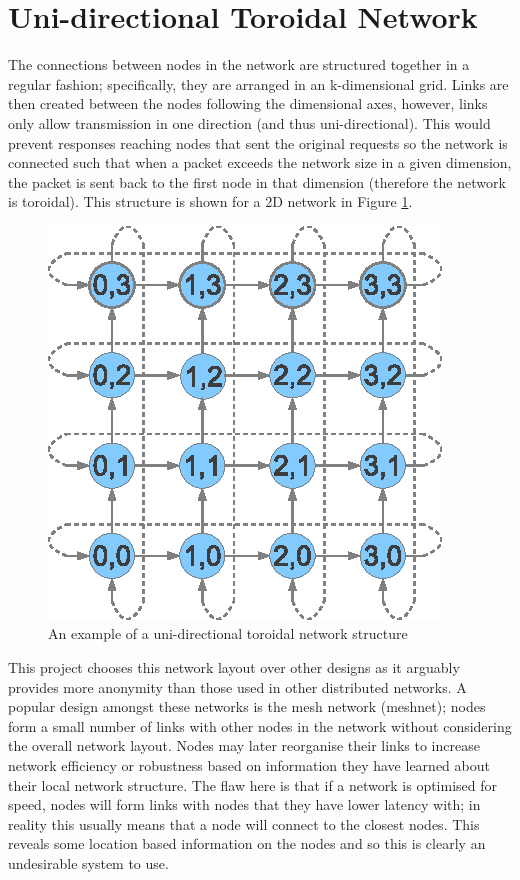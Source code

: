 \documentclass[ %
                    author={Luke Murray},
                supervisor={Dr. Simon Hollis},
                     title={Shadow Peer-to-Peer Networks},
                  subtitle={},
                    degree={MEng},
                      year={2013} ]{thesis}
\begin{document}
\section{Uni-directional Toroidal Network}

The connections between nodes in the network are structured together in a regular fashion; specifically, they are arranged in an k-dimensional grid. Links are then created between the nodes following the dimensional axes, however, links only allow transmission in one direction (and thus uni-directional). This would prevent responses reaching nodes that sent the original requests so the network is connected such that when a packet exceeds the network size in a given dimension, the packet is sent back to the first node in that dimension (therefore the network is toroidal). This structure is shown for a 2D network in Figure \ref{toroid}.

\begin{figure}[h]
\centering
\includegraphics{diagrams/network_toroidal.eps}
\caption{An example of a uni-directional toroidal network structure}
\label{toroid}
\end{figure}

This project chooses this network layout over other designs as it arguably provides more anonymity than those used in other distributed networks. A popular design amongst these networks is the mesh network (meshnet); nodes form a small number of links with other nodes in the network without considering the overall network layout. Nodes may later reorganise their links to increase network efficiency or robustness based on information they have learned about their local network structure. The flaw here is that if a network is optimised for speed, nodes will form links with nodes that they have lower latency with; in reality this usually means that a node will connect to the closest nodes. This reveals some location based information on the nodes and so this is clearly an undesirable system to use.
\end{document}
